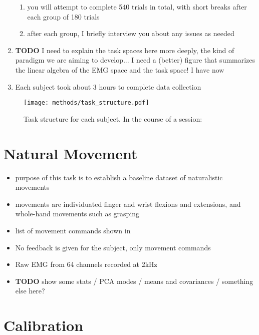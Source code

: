 \documentclass[../main.tex]{subfiles}
\begin{document}
\begin{enumerate}
\begin{enumerate}
    \item you will attempt to complete 540 trials in total, with short breaks after each group of 180 trials
    \item after each group, I briefly interview you about any issues as needed
  \end{enumerate}
  \item \textbf{TODO} I need to explain the task spaces here more deeply, the kind of paradigm we are aiming to develop... I need a (better) figure that summarizes the linear algebra of the EMG space and the task space! I have  now
  \item Each subject took about 3 hours to complete data collection 
  \end{enumerate}

  \begin{figure}[H]%
    \centering
    \texttt{[image: methods/task\_structure.pdf]}
    \caption[Task structure for each subject]{Task structure for each subject. In the course of a session:}\label{fig:task_structure}
  \end{figure}
  



\section{Natural Movement}

\begin{itemize}
  \item purpose of this task is to establish a baseline dataset of naturalistic movements
  \item movements are individuated finger and wrist flexions and extensions, and whole-hand movements such as grasping
  \item list of movement commands shown in 
  \item No feedback is given for the subject, only movement commands
  \item Raw EMG from 64 channels recorded at 2kHz
  \item \textbf{TODO} show some stats / PCA modes / means and covariances / something else here?
\end{itemize}



\section{Calibration}
\end{document}
